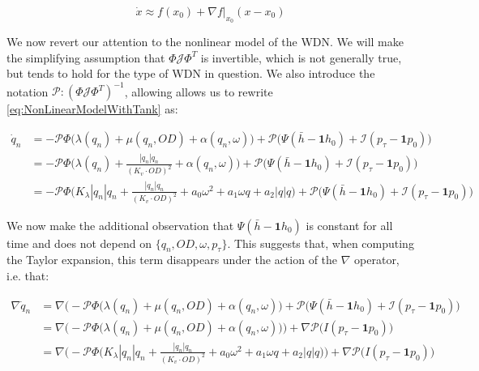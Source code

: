 \begin{equation}\label{eq:TaylorSeries}
\dot{x} \approx f(x_0) + \nabla f\bigg\rvert_{x_0} (x-x_0)
\end{equation}

We now revert our attention to the nonlinear model of the WDN. We will make the simplifying assumption that $\Phi \mathcal{J} \Phi^T$ is invertible, which is not generally true, but tends to hold for the type of WDN in question. We also introduce the notation $\mathcal{P}: (\Phi \mathcal{J} \Phi^T)^{-1}$, allowing allows us to rewrite \cref{eq:NonLinearModelWithTank} as:

\begin{equation}\label{eq:NonLinearModelSimplified}
	\begin{split}
		\dot{q}_n &=  -\mathcal{P}\Phi\Big(\lambda(q_n)+\mu(q_n,OD)+\alpha(q_n,\omega)\Big) + \mathcal{P}\Big(\Psi(\bar{h}-\mathbf{1}h_0) + \mathcal{I}(p_{\tau}-\mathbf{1}p_0)\Big) \\
		&= 	-\mathcal{P}\Phi\Big(\lambda(q_n)+\frac{|q_n|q_n}{(K_v\cdot OD)^2}+\alpha(q_n,\omega)\Big) + 	\mathcal{P}\Big(\Psi(\bar{h}-\mathbf{1}h_0) + \mathcal{I}(p_{\tau}-\mathbf{1}p_0)\Big) \\
		& = -\mathcal{P}\Phi\Big(K_\lambda|q_n|q_n+\frac{|q_n|q_n}{(K_v\cdot OD)^2}+a_0\omega^2+a_1\omega q+a_2|q|q\Big) + \mathcal{P}\Big(\Psi(\bar{h}-\mathbf{1}h_0) + \mathcal{I}(p_{\tau}-\mathbf{1}p_0)\Big)
	\end{split}	
\end{equation}

We now make the additional observation that $\Psi(\bar{h}-\mathbf{1}h_0)$ is constant for all time and does not depend on $\{q_n,OD,\omega,p_\tau\}$. This suggests that, when computing the Taylor expansion, this term disappears under the action of the $\nabla$ operator, i.e. that:

\begin{equation}\label{eq:PressureHeightDisappear}
	\begin{split}
		\nabla \dot{q}_n &= \nabla \Big(-\mathcal{P}\Phi\Big(\lambda(q_n)+\mu(q_n,OD)+\alpha(q_n,\omega)\Big) + \mathcal{P}\Big(\Psi(\bar{h}-\mathbf{1}h_0) + \mathcal{I}(p_{\tau}-\mathbf{1}p_0)\Big) \\ 
		&=\nabla \Big(-\mathcal{P}\Phi\Big(\lambda(q_n)+\mu(q_n,OD)+\alpha(q_n,\omega)\Big)\Big) + \nabla \mathcal{P}\Big({I}(p_{\tau}-\mathbf{1}p_0)\Big) \\
		&=\nabla \Big(-\mathcal{P}\Phi\Big(K_\lambda|q_n|q_n+\frac{|q_n|q_n}{(K_v\cdot OD)^2}+a_0\omega^2+a_1\omega q+a_2|q|q\Big)\Big) + \nabla \mathcal{P}\Big({I}(p_{\tau}-\mathbf{1}p_0)\Big)
	\end{split}
\end{equation}

